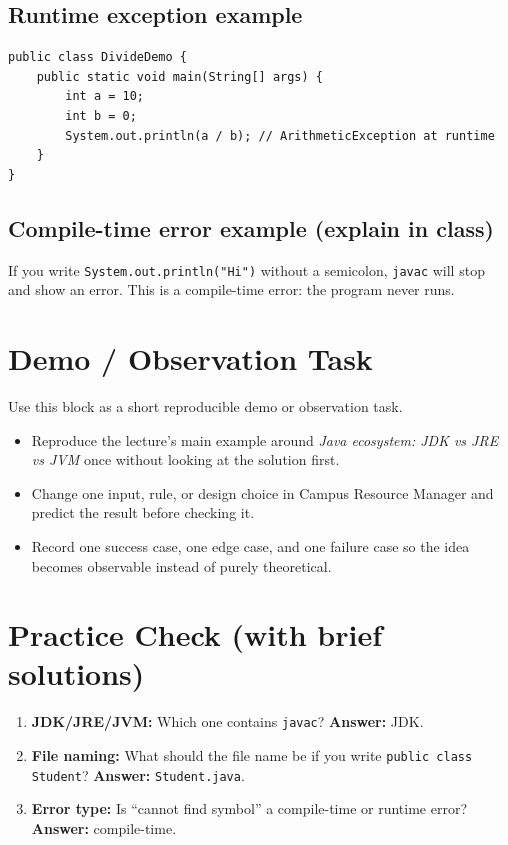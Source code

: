 \documentclass[11pt]{article}
\begin{document}
\subsection*{Runtime exception example}
\begin{lstlisting}
public class DivideDemo {
    public static void main(String[] args) {
        int a = 10;
        int b = 0;
        System.out.println(a / b); // ArithmeticException at runtime
    }
}
\end{lstlisting}

\subsection*{Compile-time error example (explain in class)}
If you write \texttt{System.out.println("Hi")} without a semicolon, \texttt{javac} will stop and show an error.
This is a compile-time error: the program never runs.

\section{Demo / Observation Task}
Use this block as a short reproducible demo or observation task.
\begin{itemize}
  \item Reproduce the lecture's main example around \textit{Java ecosystem: JDK vs JRE vs JVM} once without looking at the solution first.
  \item Change one input, rule, or design choice in Campus Resource Manager and predict the result before checking it.
  \item Record one success case, one edge case, and one failure case so the idea becomes observable instead of purely theoretical.
\end{itemize}
\notesources{\OOPSUnitISources}

\section{Practice Check (with brief solutions)}
\begin{enumerate}
  \item \textbf{JDK/JRE/JVM:} Which one contains \texttt{javac}? \textbf{Answer:} JDK.
  \item \textbf{File naming:} What should the file name be if you write \texttt{public class Student}? \textbf{Answer:} \texttt{Student.java}.
  \item \textbf{Error type:} Is ``cannot find symbol'' a compile-time or runtime error? \textbf{Answer:} compile-time.
\end{enumerate}
\end{document}
